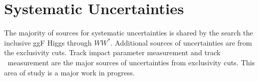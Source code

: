 \section{Systematic Uncertainties}
\label{sec:syst}

\par The majority of sources for systematic uncertainties is shared by the search the inclusive ggF 
Higgs through $WW^*$. Additional sources of uncertainties are from the exclusivity cuts. Track impact parameter
measurement and track \pt\ measurement are the major sources of uncertainties
from exclusivity cuts. This area of study is a major work in progress. 
